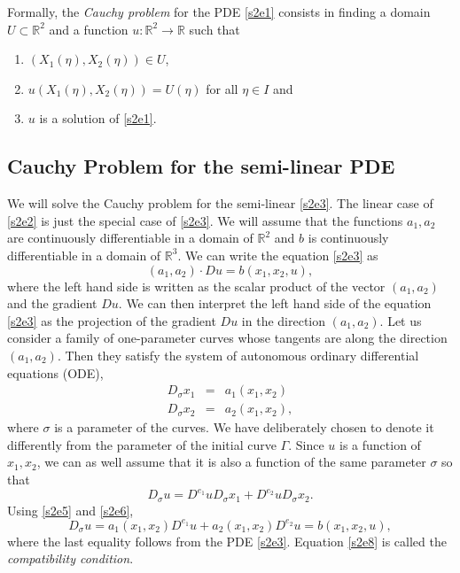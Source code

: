 \documentclass{article}
\theoremstyle{plain}
\numberwithin{thm}{section}
\theoremstyle{plain}
\numberwithin{prop}{section}
\theoremstyle{definition}
\numberwithin{defn}{section}
\theoremstyle{remark}
\numberwithin{equation}{section}
\begin{document}
Formally, the \emph{Cauchy problem} for the PDE \eqref{s2e1} consists in finding a domain $U 
\subset \mathbb{R}^2$ and a function $u:\mathbb{R}^2 \rightarrow \mathbb{R}$ such that
\begin{enumerate}
\item $(X_1(\eta), X_2(\eta)) \in U$, 
\item $u(X_1(\eta), X_2(\eta)) = U(\eta)$ for all $\eta \in I$ and
\item $u$ is a solution of \eqref{s2e1}.
\end{enumerate}

\subsection{Cauchy Problem for the semi-linear PDE}\label{s2s2}
We will solve the Cauchy problem for the semi-linear \eqref{s2e3}. The linear case of \eqref{s2e2}
is just the special case of \eqref{s2e3}. We will assume that the functions $a_1, a_2$ are 
continuously differentiable in a domain of $\mathbb{R}^2$ and $b$ is continuously differentiable
in a domain of $\mathbb{R}^3$. We can write the equation \eqref{s2e3} as
\[
(a_1, a_2)\cdot Du = b(x_1, x_2, u),
\]
where the left hand side is written as the scalar product of the vector $(a_1, a_2)$ and the
gradient $Du$. We can then interpret the left hand side of the equation \eqref{s2e3} as the projection
of the gradient $Du$ in the direction $(a_1, a_2)$. Let us consider a family of one-parameter curves
whose tangents are along the direction $(a_1, a_2)$. Then they satisfy the system of autonomous 
ordinary differential equations (ODE),
\begin{eqnarray}
D_\sigma x_1 &=& a_1(x_1, x_2) \label{s2e5} \\
D_\sigma x_2 &=& a_2(x_1, x_2), \label{s2e6}
\end{eqnarray}
where $\sigma$ is a parameter of the curves. We have deliberately chosen to denote it differently
from the parameter of the initial curve $\Gamma$. Since $u$ is a function of $x_1, x_2$, we can
as well assume that it is also a function of the same parameter $\sigma$ so that
\begin{equation}\label{s2e7}
D_\sigma u = D^{e_1}u D_\sigma x_1 + D^{e_2}u D_\sigma x_2.
\end{equation}
Using \eqref{s2e5} and \eqref{s2e6},
\begin{equation}\label{s2e8}
D_\sigma u = a_1(x_1, x_2)D^{e_1}u +  a_2(x_1, x_2)D^{e_2}u = b(x_1, x_2, u),
\end{equation}
where the last equality follows from the PDE \eqref{s2e3}. Equation \eqref{s2e8} is called the
\emph{compatibility condition}.
\end{document}

